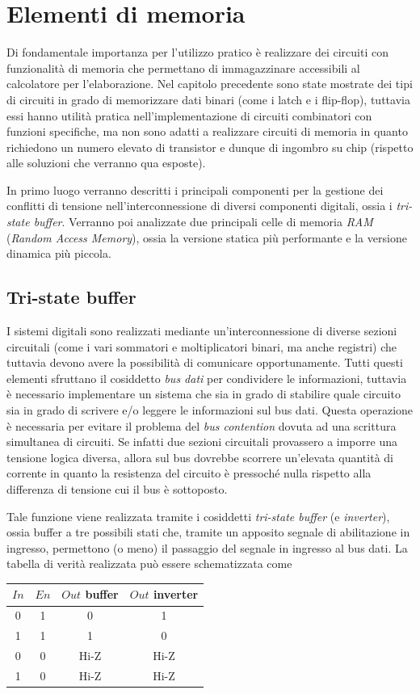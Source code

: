 \chapter{Elementi di memoria}
	Di fondamentale importanza per l'utilizzo pratico è realizzare dei circuiti con funzionalità di memoria che permettano di immagazzinare accessibili al calcolatore per l'elaborazione. Nel capitolo precedente sono state mostrate dei tipi di circuiti in grado di memorizzare dati binari (come i latch e i flip-flop), tuttavia essi hanno utilità pratica nell'implementazione di circuiti combinatori con funzioni specifiche, ma non sono adatti a realizzare circuiti di memoria in quanto richiedono un numero elevato di transistor e dunque di ingombro su chip (rispetto alle soluzioni che verranno qua esposte).
	
	In primo luogo verranno descritti i principali componenti per la gestione dei conflitti di tensione nell'interconnessione di diversi componenti digitali, ossia i \textit{tri-state buffer}. Verranno poi analizzate due principali celle di memoria \textit{RAM} (\textit{Random Access Memory}), ossia la versione statica più performante e la versione dinamica più piccola.
	
\section{Tri-state buffer}
	
	I sistemi digitali sono realizzati mediante un'interconnessione di diverse sezioni circuitali (come i vari sommatori e moltiplicatori binari, ma anche registri) che tuttavia devono avere la possibilità di comunicare opportunamente. Tutti questi elementi sfruttano il cosiddetto \textit{bus dati} per condividere le informazioni, tuttavia è necessario implementare un sistema che sia in grado di stabilire quale circuito sia in grado di scrivere e/o leggere le informazioni sul bus dati. Questa operazione è necessaria per evitare il problema del \textit{bus contention} dovuta ad una scrittura simultanea di circuiti. Se infatti due sezioni circuitali provassero a imporre una tensione logica diversa, allora sul bus dovrebbe scorrere un'elevata quantità di corrente in quanto la resistenza del circuito è pressoché nulla rispetto alla differenza di tensione cui il bus è sottoposto.
	
	Tale funzione viene realizzata tramite i cosiddetti \textit{tri-state buffer} (e \textit{inverter}), ossia buffer a tre possibili stati che, tramite un apposito segnale di abilitazione in ingresso, permettono (o meno) il passaggio del segnale in ingresso al bus dati. La tabella di verità realizzata può essere schematizzata come
	\begin{center}
	\begin{tabular}{cc|c|c}
		$In$ & $En$ & $Out$ buffer & $Out$ inverter \\ \hline
		0 & 1 & 0 & 1 \\
		1 & 1 & 1 & 0 \\
		0 & 0 & Hi-Z & Hi-Z \\
		1 & 0 & Hi-Z & Hi-Z \\
	\end{tabular}			
	\end{center}

